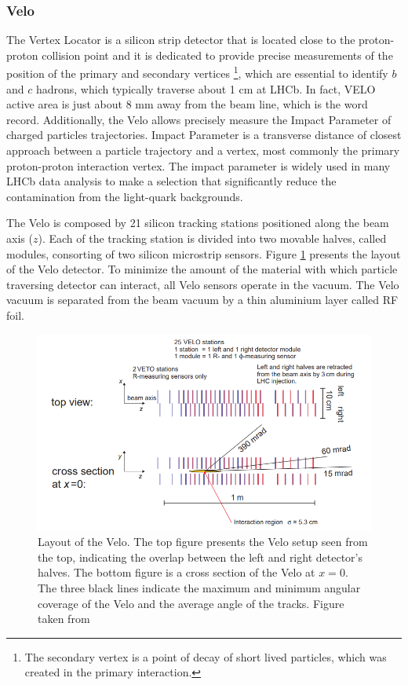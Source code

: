 \subsubsection{Velo}

The Vertex Locator is a silicon strip detector that is located close to the proton-proton collision point and it is dedicated to provide precise measurements of the position of the primary and secondary vertices \footnote{The secondary vertex is a point of decay of short lived particles, which was created in the primary interaction. }, which are essential to identify $b$ and $c$ hadrons, which typically traverse about 1 cm at LHCb.  
In fact, VELO active area is just about 8 mm away from the beam line, which is the word record. Additionally, the Velo allows precisely measure the Impact Parameter of charged particles trajectories. Impact Parameter is a transverse distance of closest approach between a particle trajectory and a vertex, most commonly the primary proton-proton interaction vertex. The impact parameter is widely used in many LHCb data analysis to make a selection that significantly reduce the contamination from the light-quark backgrounds.  


The Velo is composed by 21 silicon tracking stations positioned along the beam axis ($z$). Each of the tracking station is divided into two movable halves, called modules, consorting of two silicon microstrip sensors. Figure \ref{fig:veloLayout} presents the layout of the Velo detector. To minimize the amount of the material with which particle traversing detector can interact, all Velo sensors operate in the vacuum. The Velo vacuum is separated from the beam vacuum by a thin aluminium layer called RF foil.   


\begin{figure}[h]
\centering
\includegraphics{figures/VeloLayout.png}
\caption{Layout of the Velo. The top figure presents the Velo setup seen from the top, indicating the overlap between the left and right detector's halves. The bottom figure is a cross section of the Velo at $x=0$. The three black lines indicate the maximum and minimum angular coverage of the Velo and the average angle of the tracks. Figure taken from \cite{VeloTDR} 
\label{fig:veloLayout}}
\end{figure}


